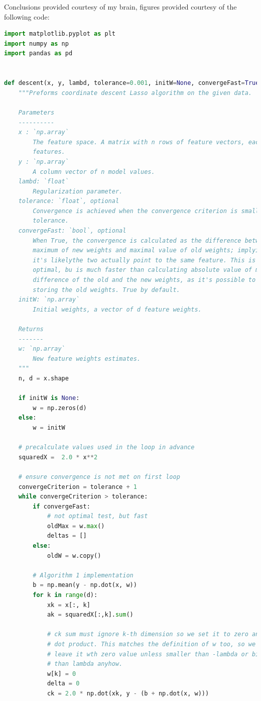 \documentclass{article}
\newcommand{\1}{\mathbf{1}}
\begin{document}
\begin{enumerate}
Conclusions provided courtesy of my brain, figures provided courtesy of the following code:
    
\begin{lstlisting}[language=Python]
import matplotlib.pyplot as plt
import numpy as np
import pandas as pd


def descent(x, y, lambd, tolerance=0.001, initW=None, convergeFast=True):
    """Preforms coordinate descent Lasso algorithm on the given data.

    Parameters
    ----------
    x : `np.array`
        The feature space. A matrix with n rows of feature vectors, each with d
        features.
    y : `np.array`
        A column vector of n model values.
    lambd: `float`
        Regularization parameter.
    tolerance: `float`, optional
        Convergence is achieved when the convergence criterion is smaller than
        tolerance.
    convergeFast: `bool`, optional
        When True, the convergence is calculated as the difference between
        maximum of new weights and maximal value of old weights; implying that
        it's likelythe two actually point to the same feature. This is not
        optimal, bu is much faster than calculating absolute value of minimal
        difference of the old and the new weights, as it's possible to avoid
        storing the old weights. True by default.
    initW: `np.array`
        Initial weights, a vector of d feature weights.

    Returns
    -------
    w: `np.array`
        New feature weights estimates. 
    """
    n, d = x.shape

    if initW is None:
        w = np.zeros(d)
    else:
        w = initW

    # precalculate values used in the loop in advance
    squaredX =  2.0 * x**2

    # ensure convergence is not met on first loop
    convergeCriterion = tolerance + 1
    while convergeCriterion > tolerance:
        if convergeFast:
            # not optimal test, but fast
            oldMax = w.max()
            deltas = []
        else:
            oldW = w.copy()

        # Algorithm 1 implementation
        b = np.mean(y - np.dot(x, w))
        for k in range(d):
            xk = x[:, k]
            ak = squaredX[:,k].sum()

            # ck sum must ignore k-th dimension so we set it to zero and use
            # dot product. This matches the definition of w too, so we can
            # leave it wth zero value unless smaller than -lambda or bigger
            # than lambda anyhow. 
            w[k] = 0
            delta = 0
            ck = 2.0 * np.dot(xk, y - (b + np.dot(x, w)))


\end{lstlisting}
\end{enumerate}
\end{document}
